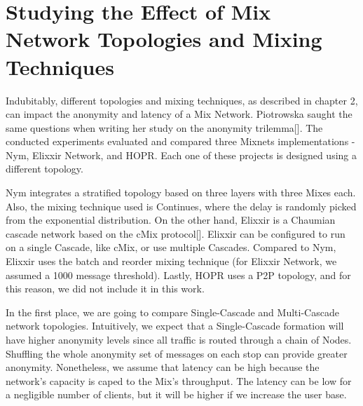 \documentclass[logo,msc,cyber]{infthesis}   %
\begin{document}
\section{Studying the Effect of Mix Network Topologies and Mixing Techniques}

Indubitably, different topologies and mixing techniques, as described in chapter 2,
can impact the anonymity and latency of a Mix Network. Piotrowska saught the
same questions when writing her study on the anonymity trilemma[]. The conducted
experiments evaluated and compared three Mixnets implementations - Nym, Elixxir
Network, and HOPR. Each one of these projects is designed using a different
topology. 

Nym integrates a stratified topology based on three layers with three Mixes each.
Also, the mixing technique used is Continues, where the delay is randomly
picked from the exponential distribution. On the other hand, Elixxir is a
Chaumian cascade network based on the cMix protocol[]. Elixxir can be configured
to run on a single Cascade, like cMix, or use multiple Cascades. Compared to
Nym, Elixxir uses the batch and reorder mixing technique (for Elixxir Network,
we assumed a 1000 message threshold). Lastly, HOPR uses a P2P topology, and for
this reason, we did not include it in this work.


In the first place, we are going to compare Single-Cascade and Multi-Cascade
network topologies. Intuitively, we expect that a Single-Cascade formation will
have higher anonymity levels since all traffic is routed through a chain of
Nodes. Shuffling the whole anonymity set of messages on each stop can provide
greater anonymity. Nonetheless, we assume that latency can be high because the
network's capacity is caped to the Mix's throughput. The latency can be low for
a negligible number of clients, but it will be higher if we increase the user
base.
\end{document}
